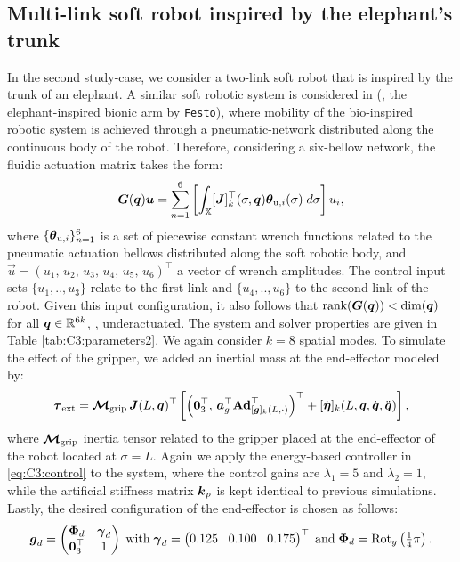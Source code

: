 \vspace{-3mm}
\subsection{Multi-link soft robot inspired by the elephant's trunk}
In the second study-case, we consider a two-link soft robot that is inspired by the trunk of an elephant. A similar soft robotic system is considered in \cite{Falkenhahn2015} (\ie, the elephant-inspired bionic arm by \texttt{Festo}), where mobility of the bio-inspired robotic system is achieved through a pneumatic-network distributed along the continuous body of the robot. Therefore, considering a six-bellow network, the fluidic actuation matrix takes the form:
%
\begin{equation*}
\boldsymbol{G}(\boldsymbol{q})\boldsymbol{u} = \sum_{n=1}^6 \left[ \int_{\mathbb{X}} [\boldsymbol{J}]_k^\top(\sigma,\boldsymbol{q}) {\boldsymbol{\theta}}_{\textrm{u},i}(\sigma)\; d\sigma\right] u_i,
\end{equation*}
%
where $\{{\boldsymbol{\theta}}_{\textrm{u},i}\}_{n=1}^6$ is a set of piecewise constant wrench functions related to the pneumatic actuation bellows distributed along the soft robotic body, and $\vec{u} = (u_1,\,u_2,\,u_3,\,u_4,\,u_5,\,u_6)^\top$ a vector of wrench amplitudes. The control input sets $\{u_1,..,u_3\}$ relate to the first link and $\{u_4,..,u_6\}$ to the second link of the robot. Given this input configuration, it also follows that $\textnormal{rank}(\boldsymbol{G}(\boldsymbol{q})) < \text{dim}(\boldsymbol{q})$ for all $\boldsymbol{q} \in \mathbb{R}^{6k}$, \ie, underactuated. The system and solver properties are given in Table \ref{tab:C3:parameters2}. We again consider $k=8$ spatial modes. To simulate the effect of the gripper, we added an inertial mass at the end-effector modeled by:
%
$$\boldsymbol{\tau}_{\textrm{ext}} =  \boldsymbol{\mathcal{M}}_{\textrm{grip}}\,{\boldsymbol{J}}(L,{\boldsymbol{q}})^\top \left[ \left(\boldsymbol{0}_3^\top,\, {\boldsymbol{a}}_g ^\top \textbf{Ad}^\top_{[{\boldsymbol{g}}]_k(L,\cdot)} \right)^\top + [\dot{{\boldsymbol{\eta}}}]_k(L,{\boldsymbol{q}},{\dot{\boldsymbol{q}}},{\ddot{\boldsymbol{q}}}) \right],$$
%
where $\boldsymbol{\mathcal{M}}_{\textrm{grip}}$ inertia tensor related to the gripper placed at the end-effector of the robot located at $\sigma = L$. Again we apply the energy-based controller in \eqref{eq:C3:control} to the system, where the control gains are $\lambda_1 = 5$ and $\lambda_2 = 1$, while the artificial stiffness matrix $\boldsymbol{k}_p$ is kept identical to previous simulations. Lastly, the desired configuration of the end-effector is chosen as follows:
%
\begin{equation*}
\boldsymbol{g}_d = \begin{pmatrix} \boldsymbol{\Phi}_d & \boldsymbol{\gamma}_d \\ \boldsymbol{0}_3^\top & 1 \end{pmatrix} \; \text{with} \; \boldsymbol{\gamma}_d = \begin{pmatrix} 0.125 & \!0.100\! & 0.175 \end{pmatrix}^\top \;\text{and} \; {\boldsymbol{\Phi}}_d = \textrm{Rot}_y\left(\tfrac{1}{4}\pi \right).
\end{equation*}

